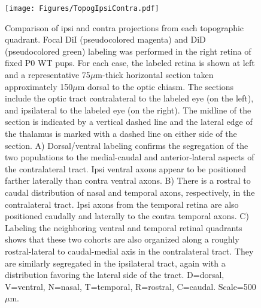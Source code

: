 \begin{figure}[hbtp]
    \begin{center}
        \texttt{[image: Figures/TopogIpsiContra.pdf]}
        \caption[Comparison of ipsi and contra projections from each topographic quadrant.]
        {Comparison of ipsi and contra projections from each topographic quadrant.
        Focal DiI (pseudocolored magenta) and DiD (pseudocolored green) labeling was performed in the right retina of fixed P0 WT pups.
        For each case, the labeled retina is shown at left and a representative 75$\mu$m-thick horizontal section taken approximately 150$\mu$m dorsal to the optic chiasm.
        The sections include the optic tract contralateral to the labeled eye (on the left), and ipsilateral to the labeled eye (on the right).
        The midline of the section is indicated by a vertical dashed line and the lateral edge of the thalamus is marked with a dashed line on either side of the section.
        A) Dorsal/ventral labeling confirms the segregation of the two populations to the medial-caudal and anterior-lateral aspects of the contralateral tract.
        Ipsi ventral axons appear to be positioned farther laterally than contra ventral axons.
        B) There is a rostral to caudal distribution of nasal and temporal axons, respectively, in the contralateral tract.
        Ipsi axons from the temporal retina are also positioned caudally and laterally to the contra temporal axons.
        C) Labeling the neighboring ventral and temporal retinal quadrants shows that these two cohorts are also organized along a roughly rostral-lateral to caudal-medial axis in the contralateral tract.
        They are similarly segregated in the ipsilateral tract, again with a distribution favoring the lateral side of the tract.
        D=dorsal, V=ventral, N=nasal, T=temporal, R=rostral, C=caudal.
		Scale=500$\mu$m.}
        \label{Figures/TopogIpsiContra}
    \end{center}
\end{figure}

